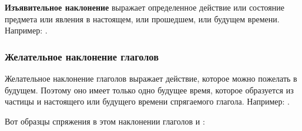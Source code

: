 \documentclass[11pt,a4paper,oneside]{memoir}
\begin{document}
\textbf{Изъявительное наклонение} выражает определенное действие или состояние предмета или явления в настоящем, или прошедшем, или будущем времени. Например: {}.

\subsubsection{Желательное наклонение глаголов}

Желательное наклонение глаголов выражает действие, которое можно пожелать в будущем. Поэтому оно имеет только одно будущее время, которое образуется из частицы {} и настоящего или будущего времени спрягаемого глагола. Например: {}.

Вот образцы спряжения в этом наклонении глаголов {} и {}:
\end{document}
